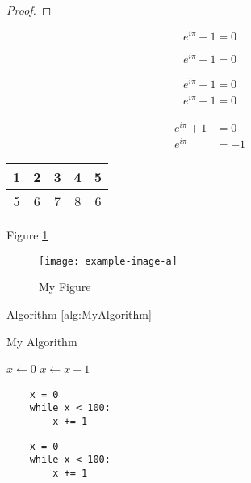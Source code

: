 \documentclass{main}
\begin{document}
\begin{theorem}[My Theorem]
    \lipsum[1][1-3]
\end{theorem}

\begin{corollary}[My Corollary]
    \lipsum[1][1-3]
\end{corollary}

\begin{lemma}[My Lemma]
    \lipsum[1][1-3]
\end{lemma}

\begin{remark}[My Remark]
    \lipsum[1][1]
\end{remark}

\begin{proof}
    \lipsum[1][1-3]
\end{proof}

\begin{equation}
    e^{i\pi}+1=0
\end{equation}

\begin{equation*}
    e^{i\pi}+1=0
\end{equation*}

\begin{gather}
    e^{i\pi}+1=0 \\
    e^{i\pi}+1=0
\end{gather}

\begin{align}
    e^{i\pi}+1&=0 \\
    e^{i\pi}&=-1
\end{align}

\begin{center}
\begin{tabular}{|c|c|c|c|c|} 
    \hline
    1 & 2 & 3 & 4 & 5 \\ \hline
    5 & 6 & 7 & 8 & 6 \\ \hline
\end{tabular}
\end{center}

Figure \ref{fig:MyFigure}

\begin{figure}[h]
    \centering\texttt{[image: example-image-a]}
    \caption{My Figure}\label{fig:MyFigure}
\end{figure}

Algorithm \ref{alg:MyAlgorithm}

\begin{algorithm}
    \caption{My Algorithm}\label{alg:MyAlgorithm}
    \begin{algorithmic}
        \State $x \gets 0$
            \State $x \gets x + 1$
        \EndWhile
    \end{algorithmic}
\end{algorithm}

\begin{verbatim}
    x = 0
    while x < 100:
        x += 1
\end{verbatim}

\lstset{language=Python}
\begin{lstlisting}
    x = 0
    while x < 100:
        x += 1
\end{lstlisting}
\end{document}
